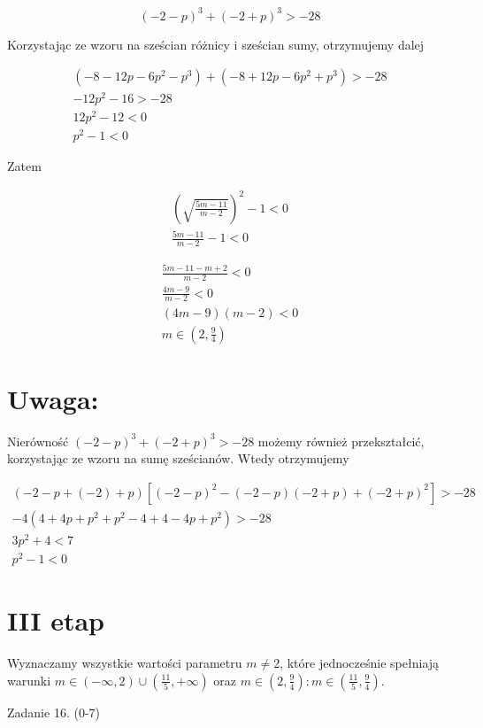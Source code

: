 \documentclass[10pt]{article}
\begin{document}
$$
(-2-p)^{3}+(-2+p)^{3}>-28
$$

Korzystając ze wzoru na sześcian różnicy i sześcian sumy, otrzymujemy dalej

$$
\begin{gathered}
\left(-8-12 p-6 p^{2}-p^{3}\right)+\left(-8+12 p-6 p^{2}+p^{3}\right)>-28 \\
-12 p^{2}-16>-28 \\
12 p^{2}-12<0 \\
p^{2}-1<0
\end{gathered}
$$

Zatem

$$
\begin{gathered}
\left(\sqrt{\frac{5 m-11}{m-2}}\right)^{2}-1<0 \\
\frac{5 m-11}{m-2}-1<0
\end{gathered}
$$

$$
\begin{gathered}
\frac{5 m-11-m+2}{m-2}<0 \\
\frac{4 m-9}{m-2}<0 \\
(4 m-9)(m-2)<0 \\
m \in\left(2, \frac{9}{4}\right)
\end{gathered}
$$

\section*{Uwaga:}
Nierówność $(-2-p)^{3}+(-2+p)^{3}>-28$ możemy również przekształcić, korzystając ze wzoru na sumę sześcianów. Wtedy otrzymujemy

$$
\begin{gathered}
(-2-p+(-2)+p)\left[(-2-p)^{2}-(-2-p)(-2+p)+(-2+p)^{2}\right]>-28 \\
-4\left(4+4 p+p^{2}+p^{2}-4+4-4 p+p^{2}\right)>-28 \\
3 p^{2}+4<7 \\
p^{2}-1<0
\end{gathered}
$$

\section*{III etap}
Wyznaczamy wszystkie wartości parametru $m \neq 2$, które jednocześnie spełniają warunki $m \in(-\infty, 2) \cup\left(\frac{11}{5},+\infty\right)$ oraz $m \in\left(2, \frac{9}{4}\right): m \in\left(\frac{11}{5}, \frac{9}{4}\right)$.

Zadanie 16. (0-7)
\end{document}
